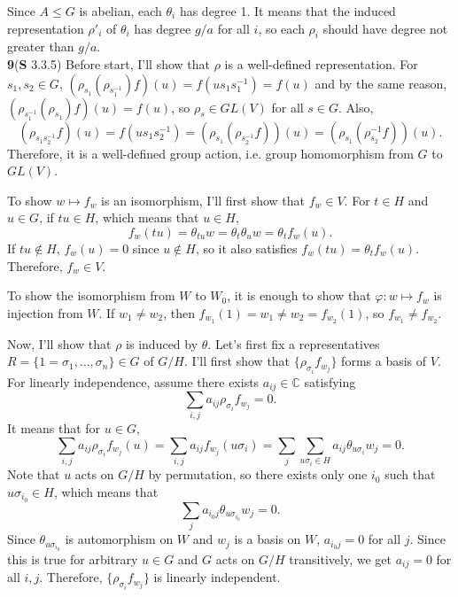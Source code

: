 \documentclass[a4paper, 12pt]{article}
\theoremstyle{Mydefinition}
\theoremstyle{Mytheorem}
\begin{document}
Since $A\leq G$ is abelian, each $\theta_i$ has degree 1. It means that the induced representation $\rho'_i$ of $\theta_i$ has degree $g/a$ for all $i$, so each $\rho_i$ should have degree not greater than $g/a$.\\

\noindent \textbf{9}(\textbf{S} 3.3.5)
Before start, I'll show that $\rho$ is a well-defined representation. For $s_1,s_2\in G$, $(\rho_{s_1}(\rho_{s^{-1}_1})f)(u) = f(us_1s_1^{-1}) = f(u)$ and by the same reason, $(\rho_{s^{-1}_1}(\rho_{s_1})f)(u) = f(u)$, so $\rho_s\in GL(V)$ for all $s\in G$. Also,
\begin{equation}
    (\rho_{s_1s^{-1}_2}f)(u) = f(us_1s^{-1}_2) = (\rho_{s_1}(\rho_{s^{-1}_2}f))(u) = (\rho_{s_1}(\rho^{-1}_{s_2}f))(u).
\end{equation}
Therefore, it is a well-defined group action, i.e. group homomorphism from $G$ to $GL(V)$.

To show $w\mapsto f_w$ is an isomorphism, I'll first show that $f_w\in V$. For $t\in H$ and $u\in G$, if $tu\in H$, which means that $u\in H$,
\begin{equation}
    f_w(tu) = \theta_{tu}w = \theta_t\theta_uw = \theta_tf_w(u).
\end{equation}
If $tu\not\in H$, $f_w(u) = 0$ since $u\not\in H$, so it also satisfies $f_w(tu) = \theta_tf_w(u)$. Therefore, $f_w\in V$.

To show the isomorphism from $W$ to $W_0$, it is enough to show that $\varphi:w\mapsto f_w$ is injection from $W$. If $w_1\neq w_2$, then $f_{w_1}(1)=w_1\neq w_2 = f_{w_2}(1)$, so $f_{w_1}\neq f_{w_2}$.

Now, I'll show that $\rho$ is induced by $\theta$. Let's first fix a representatives $R=\{1=\sigma_1, \ldots, \sigma_n\}\in G$ of $G/H$. I'll first show that $\{\rho_{\sigma_i}f_{w_j}\}$ forms a basis of $V$. For linearly independence, assume there exists $a_{ij}\in\mathbb{C}$ satisfying
\begin{equation}
    \sum_{i,j}a_{ij}\rho_{\sigma_i} f_{w_j} = 0.
\end{equation}
It means that for $u\in G$,
\begin{equation}
    \sum_{i,j}a_{ij}\rho_{\sigma_i} f_{w_j}(u) = \sum_{i,j}a_{ij} f_{w_j}(u\sigma_i) = \sum_j\sum_{u\sigma_i\in H}a_{ij} \theta_{u\sigma_i}w_j = 0.
\end{equation}
Note that $u$ acts on $G/H$ by permutation, so there exists only one $i_0$ such that $u\sigma_{i_0}\in H$, which means that
\begin{equation}
    \sum_ja_{i_0j} \theta_{u\sigma_{i_0}}w_j = 0.
\end{equation}
Since $\theta_{u\sigma_{i_0}}$ is automorphism on $W$ and $w_j$ is a basis on $W$, $a_{i_0j} = 0$ for all $j$. Since this is true for arbitrary $u\in G$ and $G$ acts on $G/H$ transitively, we get $a_{ij}=0$ for all $i,j$. Therefore, $\{\rho_{\sigma_i}f_{w_j}\}$ is linearly independent.
\end{document}
